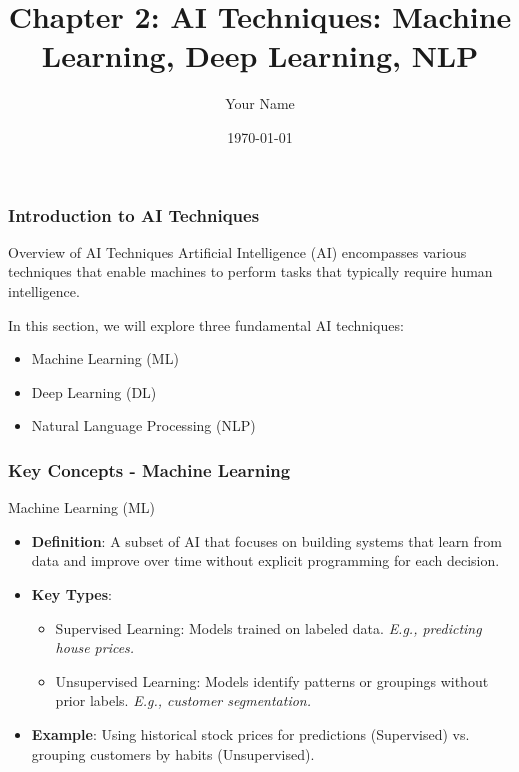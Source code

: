 \documentclass{beamer}
\title{Chapter 2: AI Techniques: Machine Learning, Deep Learning, NLP}
\author{Your Name}
\institute{Your Institution}
\date{\today}
\begin{document}
\frame{\titlepage}

\begin{frame}[fragile]
    \frametitle{Introduction to AI Techniques}
    \begin{block}{Overview of AI Techniques}
        Artificial Intelligence (AI) encompasses various techniques that enable machines to perform tasks that typically require human intelligence.
        
        In this section, we will explore three fundamental AI techniques:
        \begin{itemize}
            \item Machine Learning (ML)
            \item Deep Learning (DL)
            \item Natural Language Processing (NLP)
        \end{itemize}
    \end{block}
\end{frame}

\begin{frame}[fragile]
    \frametitle{Key Concepts - Machine Learning}
    \begin{block}{Machine Learning (ML)}
        \begin{itemize}
            \item \textbf{Definition}: A subset of AI that focuses on building systems that learn from data and improve over time without explicit programming for each decision.
            \item \textbf{Key Types}:
            \begin{itemize}
                \item Supervised Learning: Models trained on labeled data. \textit{E.g., predicting house prices.}
                \item Unsupervised Learning: Models identify patterns or groupings without prior labels. \textit{E.g., customer segmentation.}
            \end{itemize}
            \item \textbf{Example}: Using historical stock prices for predictions (Supervised) vs. grouping customers by habits (Unsupervised).
        \end{itemize}
    \end{block}
\end{frame}
\end{document}
